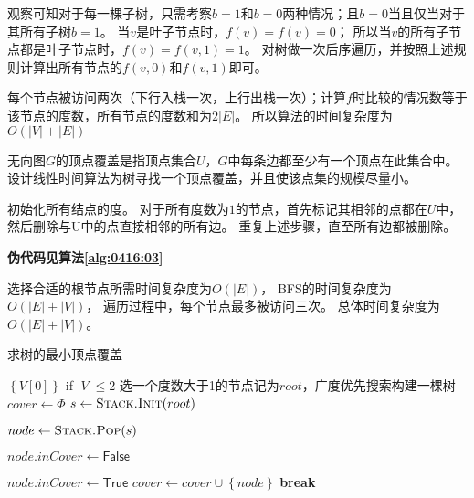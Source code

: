 \begin{questions}
\begin{solution}
        观察可知对于每一棵子树，只需考察$b=1$和$b=0$两种情况；且$b=0$当且仅当对于其所有子树$b=1$。
        当$v$是叶子节点时，$f(v) = f(v) = 0$；
        所以当$v$的所有子节点都是叶子节点时，$f(v) = f(v, 1) = 1$。
        对树做一次后序遍历，并按照上述规则计算出所有节点的$f(v,0)和f(v,1)$即可。

        每个节点被访问两次（下行入栈一次，上行出栈一次）；计算$f$时比较的情况数等于该节点的度数，所有节点的度数和为$2|E|$。
        所以算法的时间复杂度为$O(|V|+|E|)$
    \end{solution}

    \question 无向图$G$的顶点覆盖是指顶点集合$U$，$G$中每条边都至少有一个顶点在此集合中。
    设计线性时间算法为树寻找一个顶点覆盖，并且使该点集的规模尽量小。

    \begin{solution}
        初始化所有结点的度。
        对于所有度数为$1$的节点，首先标记其相邻的点都在$U$中，然后删除与U中的点直接相邻的所有边。
        重复上述步骤，直至所有边都被删除。

        \textbf{伪代码见算法\ref{alg:0416:03}}

        选择合适的根节点所需时间复杂度为$O(|E|)$，
        BFS的时间复杂度为$O(|E|+|V|)$，
        遍历过程中，每个节点最多被访问三次。
        总体时间复杂度为$O(|E|+|V|)$。
    \end{solution}

    \begin{algorithm}[!htp]
        \caption{求树的最小顶点覆盖} \label{alg:0416:03}
        \begin{algorithmic}[1]

            \State \Return $\left\{ V[0] \right\}$ if {$|V| \le 2$}
            \State 选一个度数大于1的节点记为$root$，广度优先搜索构建一棵树
            \State $cover \gets \Phi$
            \State $s \gets \Call{Stack.Init}{root}$

             

            \State $node \gets \Call{Stack.Pop}{s}$

             

            \State $node.inCover \gets \mathsf{False}$

             

                    \State $node.inCover \gets \mathsf{True}$
                    \State $ cover \gets cover \cup \left\{ node \right\} $
                    \State \textbf{break}
                \EndIf
            \EndFor


\end{algorithmic}
\end{algorithm}
\end{questions}
